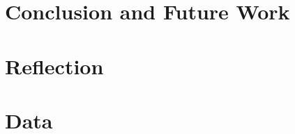 \documentclass[12pt,twosided]{report}
\begin{document}
\chapter{Conclusion and Future Work}
\label{chap:outro}


\chapter{Reflection}
\label{chap:Reflection}



  
% 

\chapter{Data}


% 

\clearpage
\printbibliography[heading=bibintoc,title=References]
\end{document}
